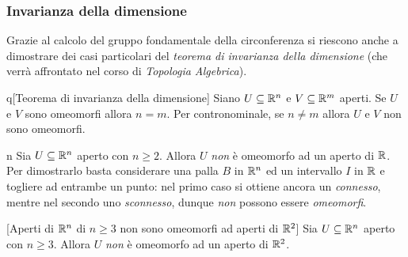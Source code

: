 \subsubsection{Invarianza della dimensione}
Grazie al calcolo del gruppo fondamentale della circonferenza si riescono anche a dimostrare dei casi particolari del \textit{teorema di invarianza della dimensione} (che verrà affrontato nel corso di \textit{Topologia Algebrica}).
\begin{theorem}{q}[Teorema di invarianza della dimensione]
Siano $U\subseteq\mathbb{R}^n$ e $V\subseteq \mathbb{R}^m$ aperti. Se $U$ e $V$ sono omeomorfi allora $n=m$. Per contronominale, se $n\neq m$ allora $U$ e $V$ non sono omeomorfi.\qedhere
\end{theorem}
\begin{example}{n}
	Sia $U\subseteq\mathbb{R}^n$ aperto con $n\geq 2$. Allora $U$ \textit{non} è omeomorfo ad un aperto di $\mathbb{R}$. Per dimostrarlo basta considerare una palla $B$ in $\mathbb{R}^n$ ed un intervallo $I$ in $\mathbb{R}$ e togliere ad entrambe un punto: nel primo caso si ottiene ancora un \textit{connesso}, mentre nel secondo uno \textit{sconnesso}, dunque \textit{non} possono essere \textit{omeomorfi}.
\end{example}
\begin{theorem}{}[Aperti di $\mathbb{R}^n$ di $n\geq 3$ non sono omeomorfi ad aperti di $\mathbb{R}^2$]\label{invarianzadimensionen=2}
	Sia $U\subseteq\mathbb{R}^n$ aperto con $n\geq 3$. Allora $U$ \textit{non} è omeomorfo ad un aperto di $\mathbb{R}^2$.
\end{theorem}

